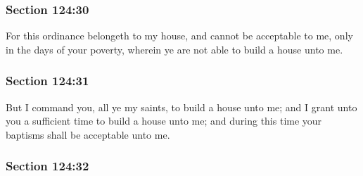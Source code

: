 
	\subsubsection{Section 124:30} %
		\label{DC124-30}

		For this ordinance belongeth to my house, and cannot be acceptable to me, only in the days of your poverty, wherein ye are not able to build a house unto me.


	\subsubsection{Section 124:31} %
		\label{DC124-31}

		But I command you, all ye my saints, to build a house unto me; and I grant unto you a sufficient time to build a house unto me; and during this time your baptisms shall be acceptable unto me.


	\subsubsection{Section 124:32} %
		\label{DC124-32}

